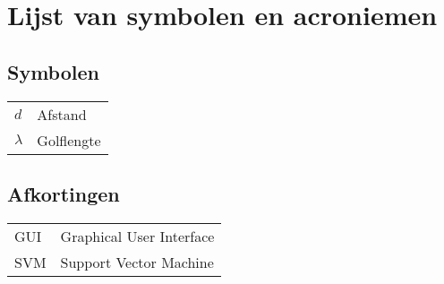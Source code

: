 \chapter*{Lijst van symbolen en acroniemen}

\section*{Symbolen}

\begin{longtable}{ll}
$d$					& Afstand\\
$\lambda$		& Golflengte\\
\end{longtable}


\section*{Afkortingen}

\begin{longtable}{ll}
\textsc{GUI}	& Graphical User Interface\\
\textsc{SVM}	& Support Vector Machine\\
\end{longtable}
